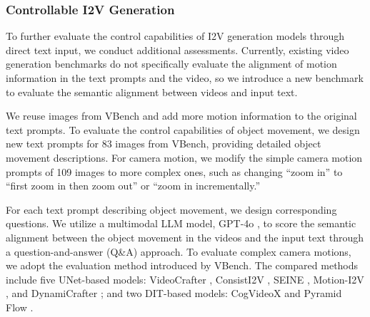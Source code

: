 \subsubsection{Controllable I2V Generation}
\label{subsubsec: controllable}
To further evaluate the control capabilities of I2V generation models through direct text input, we conduct additional assessments. Currently, existing video generation benchmarks do not specifically evaluate the alignment of motion information in the text prompts and the video, so we introduce a new benchmark to evaluate the semantic alignment between videos and input text.

We reuse images from VBench \cite{huang2024vbench} and add more motion information to the original text prompts. To evaluate the control capabilities of object movement, we design new text prompts for 83 images from VBench, providing detailed object movement descriptions. For camera motion, we modify the simple camera motion prompts of 109 images to more complex ones, such as changing “zoom in” to “first zoom in then zoom out” or “zoom in incrementally.”

For each text prompt describing object movement, we design corresponding questions. We utilize a multimodal LLM model, GPT-4o \cite{Chatgpt}, to score the semantic alignment between the object movement in the videos and the input text through a question-and-answer (Q\&A) approach. To evaluate complex camera motions, we adopt the evaluation method introduced by VBench. The compared methods include five UNet-based models: VideoCrafter \cite{chen2023videocrafter1}, ConsistI2V \cite{ren2024consisti2v}, SEINE \cite{chen2023seine}, Motion-I2V \cite{shi2024motion}, and DynamiCrafter \cite{xing2025dynamicrafter}; and two DIT-based models: CogVideoX \cite{yang2024cogvideox} and Pyramid Flow \cite{jin2024pyramidal}.

